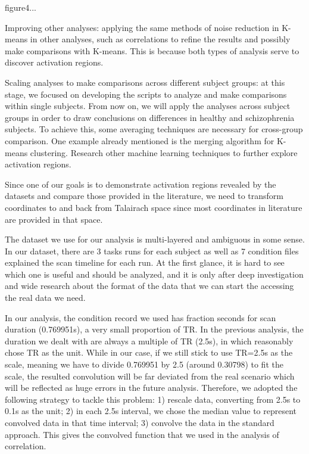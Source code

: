 \documentclass[11pt]{article}
\begin{document}
figure4...

Improving other analyses: applying the same methods of noise reduction in
K-means in other analyses, 
such as correlations to refine the results and possibly make comparisons with
K-means. This is because both types of analysis serve to discover activation
regions. 

Scaling analyses to make comparisons across different subject groups: at this
stage, we focused on developing the scripts to analyze and make comparisons
within single subjects. From now on, we will apply the analyses across subject
groups in order to draw conclusions on differences in healthy and schizophrenia
subjects. To achieve this, some averaging techniques are necessary for
cross-group comparison. One example already mentioned is the merging algorithm
for K-means clustering. Research other machine learning techniques to further
explore activation regions.

Since one of our goals is to demonstrate activation regions revealed by the
datasets and compare those provided in the literature, we need to transform
coordinates to and back from Talairach space since most coordinates in
literature are provided in that space.

The dataset we use for our analysis is multi-layered and ambiguous in some
sense. In our dataset, there are 3 tasks runs for each subject as well as 7
condition files explained the scan timeline for each run. At the first glance,
it is hard to see which one is useful and should be analyzed, and it is only
after deep investigation and wide research about the format of the data that we
can start the accessing the real data we need. 

In our analysis, the condition record we used has fraction seconds for scan
duration (0.769951s), a very small proportion of TR. In the previous analysis,
the duration we dealt with are always a multiple of TR (2.5s), in which
reasonably chose TR as the unit. While in our case, if we still stick to use
TR=2.5s as the scale, meaning we have to divide 0.769951 by 2.5 (around 0.30798)
to fit the scale, the resulted convolution will be far deviated from the real
scenario which will be reflected as huge errors in the future
analysis. Therefore, we adopted the following strategy to tackle this problem:
1) rescale data, converting from 2.5s to 0.1s as the unit; 2) in each 2.5s
interval, we chose the median value to represent convolved data in that time
interval; 3) convolve the data in the standard approach. This gives the
convolved function that we used in the analysis of correlation. 
\end{document}
